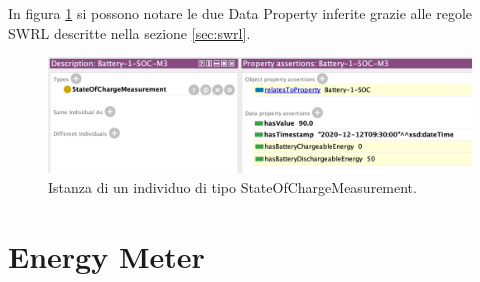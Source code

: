 In figura \ref{fig:individual_batterym3} si possono notare le due Data Property inferite grazie alle regole SWRL descritte nella sezione \ref{sec:swrl}.
\begin{figure}[H]
    \centering
    \includegraphics[width=12cm]{images/individual-batterym3.png}
    \caption{Istanza di un individuo di tipo StateOfChargeMeasurement.}
    \label{fig:individual_batterym3}
\end{figure}

\section{Energy Meter}


